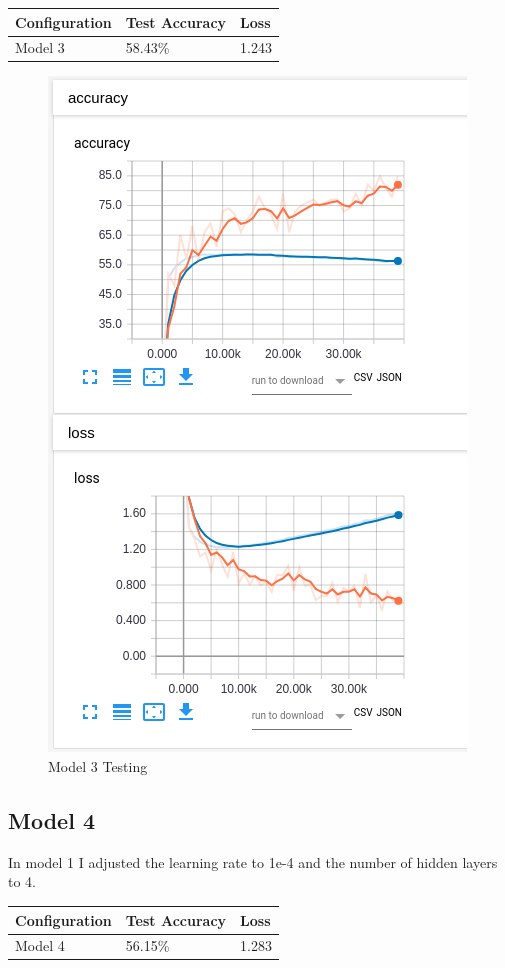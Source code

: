 \documentclass[12pt, letter]{article}
\begin{document}
  \begin{tabular}{lll}
    Configuration  & Test Accuracy & Loss  \\
    \hline
    Model 3        & 58.43\%       & 1.243
  \end{tabular}

  \begin{figure}[H]
    \centering
    \includegraphics[width=0.8 \textwidth]{lr1e4unit128}
    \caption{Model 3 Testing}
    \label{fig:eg}
  \end{figure}

  \subsection{Model 4}
  In model 1 I adjusted the learning rate to {1e-4} and the number of hidden
  layers to 4. \\

  \begin{tabular}{lll}
    Configuration  & Test Accuracy & Loss  \\
    \hline
    Model 4        & 56.15\%        & 1.283
  \end{tabular}
\end{document}
